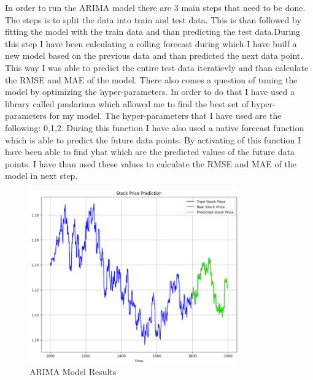 \documentclass{imc-inf}
\begin{document}
	
	In order to run the ARIMA model there are 3 main steps that need to be done. The steps is to split the data into train and test data. This is than followed by fitting the model with the train data
	and than predicting the test data.During this step I have been calculating a rolling forecast during which I have builf a new model based on the previous data and than predicted 
	the next data point. This way I was able to predict the entire test data iteratievly and than calculate the RMSE and MAE of the model. There also comes a question of tuning the
	model by optimizing the hyper-parameters. In order to do that I have used a library called pmdarima which allowed me to find the best set of hyper-parameters for my model.
	The hyper-parameters that I have used are the following: 0,1,2. During this function I have also used a native forecast function which is able to predict the future data points.
	By activating of this function I have been able to find yhat which are the predicted values of the future data points. I have than used these values to calculate the RMSE and MAE
	of the model in next step.
	
	\begin{figure}
		\centering
		\includegraphics[width=0.8\textwidth]{arima_chart.png}
		\caption{ARIMA Model Results}
		\label{fig:arima_model_plots}
	\end{figure}
	
\end{document}
